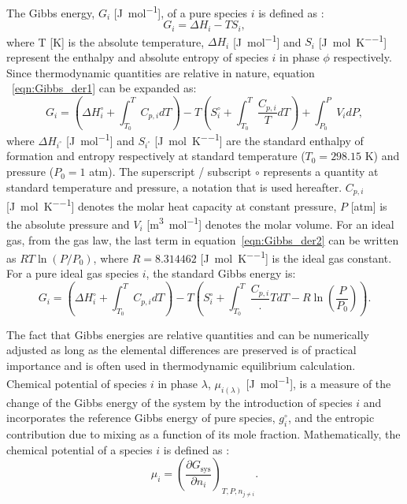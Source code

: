 	The Gibbs energy, $G_{i}$ [\si{\joule \per \mole}], of a pure species  $i$ is defined as \cite{Zemansky81}:
	\begin{equation} \label{eqn:Gibbs_der1}
			G_{i} = \Delta H_{i} - TS_{i},
	\end{equation}
	where T [\si{\kelvin}] is the absolute temperature, $\Delta H_{i}$ [\si{\joule \per \mole}] and $S_{i}$ [\si{\joule \per \mole \per \kelvin}] represent the enthalpy and absolute entropy of species $i$ in phase $\phi$ respectively. Since thermodynamic quantities are relative in nature, equation ~\eqref{eqn:Gibbs_der1} can be expanded as:
	\begin{equation} \label{eqn:Gibbs_der2}
			G_{i} = \left(\Delta H_{i}^\circ + \int_{T_0}^{T} C_{p,i}dT \right) - T\left( S_{i}^\circ  + \int_{T_0}^{T} \frac{C_{p,i}}{T}dT \right) + \int_{P_0}^{P} V_i dP,
	\end{equation}
	where $\Delta H_{i^\circ}$ [\si{\joule \per \mole}] and $S_{i^\circ}$ [\si{\joule \per \mole \per \kelvin}] are the standard enthalpy of formation and entropy respectively at standard temperature ($T_0 = 298.15$ \si{\kelvin}) and pressure ($P_0 = 1$ \si{atm}). The superscript / subscript $\circ$ represents a quantity at standard temperature and pressure, a notation that is used hereafter. $C_{p,i}$ [\si{\joule \per \mole \per \kelvin}]  denotes the molar heat capacity at constant pressure, $P$ [\si{atm}] is the absolute pressure and $V_i$ [\si{\meter \cubed \per \mole}] denotes the molar volume. For an ideal gas, from the gas law, the last term in equation~\eqref{eqn:Gibbs_der2} can be written as $RT \ln{\left(P/P_0\right)}$, where $R = 8.314462$ [\si{\joule \per \mole \per \kelvin}] is the ideal gas constant. For a pure ideal gas species $i$, the standard Gibbs energy is:
	\begin{equation} \label{eqn:Gibbs_der_id}
			G_{i} = \left(\Delta H_{i}^\circ + \int_{T_0}^{T} C_{p,i}dT \right) - T\left( S_{i}^\circ  + \int_{T_0}^{T} \frac{C_{p,i}}.{T}dT  - R \ln{\left(\frac{P}{P_0}\right)}\right).
	\end{equation}

	The fact that Gibbs energies are relative quantities and can be numerically adjusted as long as the elemental differences are preserved is of practical importance and is often used in thermodynamic equilibrium calculation. Chemical potential of species $i$ in phase $\lambda$, $\mu_{i(\lambda)}$ [\si{\joule \per \mole}], is a measure of the change of the Gibbs energy of the system by the introduction of species $i$ and incorporates  the reference Gibbs energy of pure species, $g_{i}^\circ$, and the entropic contribution due to mixing as a function of its mole fraction. Mathematically, the chemical potential of a species $i$ is defined as \cite{Zemansky81}:
    	\begin{equation}\label{eq:mu_def}
        		\mu_{i} = {\left (\frac{\partial G_\text{sys}}{\partial n_{i}} \right )}_{T,P,n_{j \neq i}}.
    	\end{equation}

